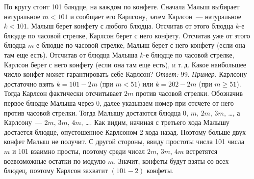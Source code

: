 \problem
По кругу стоит 101 блюдце, на каждом по конфете.
Сначала Малыш выбирает натуральное $m < 101$ и сообщает его Карлсону,
затем Карлсон~--- натуральное $k < 101$.
Малыш берет конфету с любого блюдца.
Отсчитав от этого блюдца $k$-е блюдце по часовой стрелке,
Карлсон берет с него конфету.
Отсчитав уже от этого блюдца $m$-е блюдце по часовой стрелке,
Малыш берет с него конфету (если она там еще есть).
Отсчитав от блюдца Малыша $k$-е блюдце по часовой стрелке,
Карлсон берет с него конфету (если она там еще есть), и т.\,д.
Какое наибольшее число конфет может гарантировать себе Карлсон?
\solution
\emph{Ответ:} 99.
\emph{Пример.}
Карлсону достаточно взять $k = 101 - 2 m$ (при $m < 51$) или $k = 202 - 2 m$
(при $m \geq 51$).
Тогда Карлсон фактически отсчитывает $2 m$ против часовой стрелки.
Обозначив первое блюдце Малыша через 0, далее указываем номер при отсчете от
него против часовой стрелки.
Тогда Малышу достаются блюдца $0$, $m$, $2 m$, $3 m$, \ldots,
а Карлсону~--- $2 m$, $3 m$, $4 m$, \ldots.
Как видим, начиная с третьего хода Малышу достается блюдце, опустошенное
Карлсоном 2 хода назад.
Поэтому больше двух конфет Малыш не получит.
С другой стороны, ввиду простоты числа 101 числа $m$ и 101 взаимно просты,
поэтому среди чисел $2 m$, $3 m$, $4 m$ встретятся всевозможные остатки по
модулю $m$.
Значит, конфеты будут взяты со всех блюдец, поэтому Карлсон захватит
$(101 - 2)$ конфеты.
\endproblem
